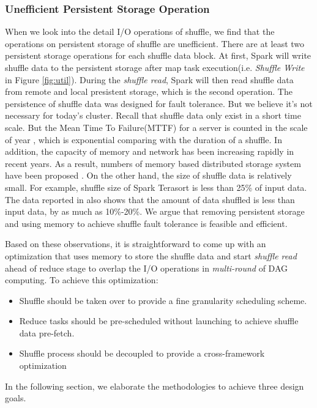 \subsubsection{Unefficient Persistent Storage Operation}
When we look into the detail I/O operations of shuffle, we find that the operations on persistent storage of shuffle are unefficient. There are at least two persistent storage operations for each shuffle data block. At first, Spark will write shuffle data to the persistent storage after map task execution(i.e. \textit{Shuffle Write} in Figure \ref{fig:util}). During the \textit{shuffle read}, Spark will then read shuffle data from remote and local presistent storage, which is the second operation. The persistence of shuffle data was designed for fault tolerance. But we believe it's not necessary for today's cluster. Recall that shuffle data only exist in a short time scale. But the Mean Time To Failure(MTTF) for a server is counted in the scale of year \cite{tachyon}, which is exponential comparing with the duration of a shuffle. In addition, the capacity of memory and network has been increasing rapidly in recent years. As a result, numbers of memory based distributed storage system have been proposed \cite{memcached, tachyon, ramcloud}. On the other hand, the size of shuffle data is relatively small. For example, shuffle size of Spark Terasort \cite{spark-tera} is less than 25\% of input data. The data reported in  \cite{makingsense} also shows that the amount of data shuffled is less than input data, by as much as 10\%-20\%. We argue that removing persistent storage and using memory to achieve shuffle fault tolerance is feasible and efficient.

Based on these observations, it is straightforward to come up with an optimization that uses memory to store the shuffle data and start \textit{shuffle read} ahead of reduce stage to overlap the I/O operations in \textit{multi-round} of DAG computing. To achieve this optimization:
\begin{itemize}
	\item Shuffle should be taken over to provide a fine granularity scheduling scheme.
	\item Reduce tasks should be pre-scheduled without launching to achieve shuffle data pre-fetch.
	\item Shuffle process should be decoupled to provide a cross-framework optimization
\end{itemize} 
In the following section, we elaborate the methodologies to achieve three design goals.
